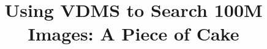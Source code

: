 \documentclass{vldb}
\begin{document}

\title{Using VDMS to Search 100M Images: A Piece of Cake}




%
%
%
%

\end{document}
